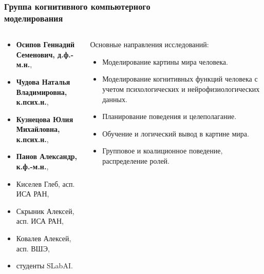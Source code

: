 	\begin{frame}
		\frametitle{Группа когнитивного компьютерного\\моделирования}
		\small
		\begin{columns}
			\begin{column}{0.5\textwidth}
				\vspace{-10pt}
				\begin{itemize}
					\item \textbf{Осипов Геннадий Семенович, д.ф.-м.н.},
					\item \textbf{Чудова Наталья Владимировна, к.псих.н.},
					\item \textbf{Кузнецова Юлия Михайловна, к.псих.н.},
					\item \textbf{Панов Александр, к.ф.-м.н.},
					\item Киселев Глеб, асп. ИСА РАН,
					\item Скрыник Алексей, асп. ИСА РАН,
					\item Ковалев Алексей, асп. ВШЭ,
					\item студенты SLabAI.
				\end{itemize}
			\end{column}
			\begin{column}{0.5\textwidth}
				Основные направления исследований:
				\begin{itemize}
					\item Моделирование картины мира человека.
					\item Моделирование когнитивных функций человека с учетом психологических и нейрофизиологических данных.
					\item Планирование поведения и целеполагание.
					\item Обучение и логический вывод в картине мира.
					\item Групповое и коалиционное поведение, распределение ролей.
				\end{itemize}
			\end{column}
		\end{columns}		
	\end{frame}	
	
